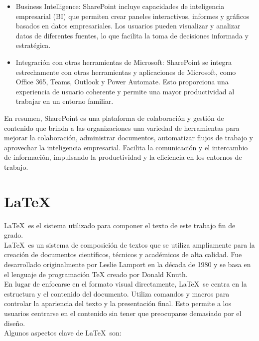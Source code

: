 \documentclass[a4paper, 12pt]{book}
\begin{document}
\begin{itemize}
\item Business Intelligence: SharePoint incluye capacidades de inteligencia empresarial (BI) que permiten crear paneles interactivos, informes y gráficos basados en datos empresariales. Los usuarios pueden visualizar y analizar datos de diferentes fuentes, lo que facilita la toma de decisiones informada y estratégica.

\item Integración con otras herramientas de Microsoft: SharePoint se integra estrechamente con otras herramientas y aplicaciones de Microsoft, como Office 365, Teams, Outlook y Power Automate. Esto proporciona una experiencia de usuario coherente y permite una mayor productividad al trabajar en un entorno familiar.
\end{itemize}

En resumen, SharePoint es una plataforma de colaboración y gestión de contenido que brinda a las organizaciones una variedad de herramientas para mejorar la colaboración, administrar documentos, automatizar flujos de trabajo y aprovechar la inteligencia empresarial. Facilita la comunicación y el intercambio de información, impulsando la productividad y la eficiencia en los entornos de trabajo.


\section{\LaTeX} 
\label{sec:LaTeX}

\LaTeX~es el sistema utilizado para componer el texto de este trabajo fin de grado.
\\

\LaTeX~es un sistema de composición de textos que se utiliza ampliamente para la creación de documentos científicos, técnicos y académicos de alta calidad. Fue desarrollado originalmente por Leslie Lamport en la década de 1980 y se basa en el lenguaje de programación TeX creado por Donald Knuth.
\\

En lugar de enfocarse en el formato visual directamente, \LaTeX~se centra en la estructura y el contenido del documento. Utiliza comandos y macros para controlar la apariencia del texto y la presentación final. Esto permite a los usuarios centrarse en el contenido sin tener que preocuparse demasiado por el diseño.
\\

Algunos aspectos clave de \LaTeX~son:
\end{document}
